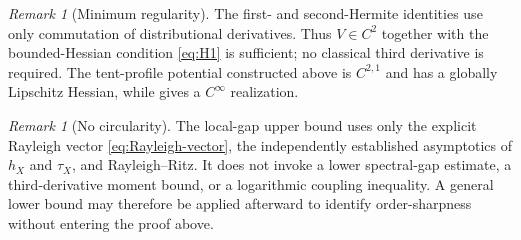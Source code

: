 \documentclass[11pt]{article}
\theoremstyle{plain}
\theoremstyle{definition}
\theoremstyle{remark}
\newtheorem{remark}[theorem]{Remark}
\newcommand{\1}{\mathbf{1}}
\begin{document}
\begin{remark}[Minimum regularity]
The first- and second-Hermite identities use only commutation of
distributional derivatives. Thus $V\in C^2$ together with the bounded-Hessian
condition \eqref{eq:H1} is sufficient; no classical third derivative is
required. The tent-profile potential constructed above is $C^{2,1}$ and has
a globally Lipschitz Hessian, while  gives a
$C^\infty$ realization.
\end{remark}

\begin{remark}[No circularity]
The local-gap upper bound uses only the explicit Rayleigh vector
\eqref{eq:Rayleigh-vector}, the independently established asymptotics of
$h_X$ and $\tau_X$, and Rayleigh--Ritz. It does not invoke a lower
spectral-gap estimate, a third-derivative moment bound, or a logarithmic
coupling inequality. A general lower bound may therefore be applied
afterward to identify order-sharpness without entering the proof above.
\end{remark}

\end{document}
